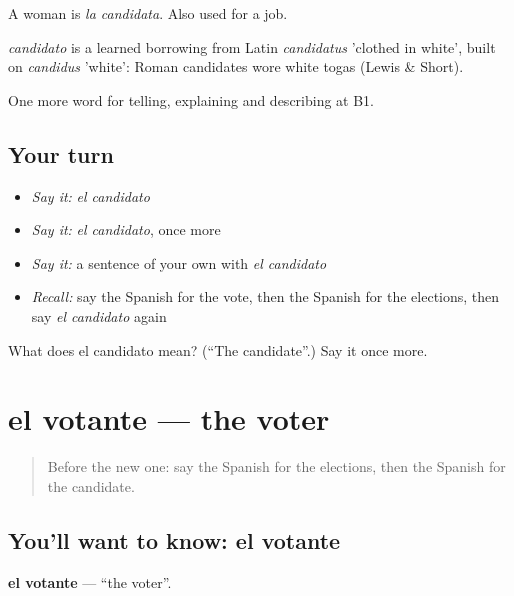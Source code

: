A woman is \emph{la candidata}. Also used for a job.

\begin{cousinweb}
\emph{candidato} is a learned borrowing from Latin \emph{candidatus} 'clothed in white', built on \emph{candidus} 'white': Roman candidates wore white togas (Lewis \& Short).
\end{cousinweb}

\begin{grammarlens}[title={What you've built}]
One more word for telling, explaining and describing at B1.
\end{grammarlens}

\subsection*{Your turn}
\begin{itemize}
\raggedright
  \item \emph{Say it:} \emph{el candidato}
  \item \emph{Say it:} \emph{el candidato}, once more
  \item \emph{Say it:} a sentence of your own with \emph{el candidato}
  \item \emph{Recall:} say the Spanish for the vote, then the Spanish for the elections, then say \emph{el candidato} again
\end{itemize}

\begin{tcolorbox}[breakable,colback=teal!4,colframe=teal!35!black,title={Before you move on}]
What does el candidato mean? (\textquotedblleft{}The candidate\textquotedblright{}.) Say it once more.
\end{tcolorbox}
\section[el votante]{el votante — the voter}

\label{lesson:ES-C602-votante}



\begin{quote}
Before the new one: say the Spanish for the elections, then the Spanish for the candidate.
\end{quote}

\subsection*{You'll want to know: el votante}
\textbf{el votante} — \textquotedblleft{}the voter\textquotedblright{}.

